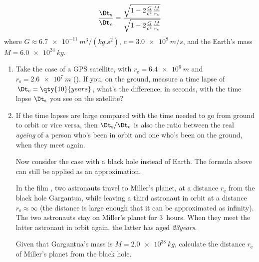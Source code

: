 \begin{exercise}[label={ex:clocks}]
{}
\begin{equation*}
  \frac{\Dt_{\text{s}}}{\Dt_{\text{e}}} =
  \frac{
    \sqrt{1-2\frac{G}{c^{2}}\frac{M}{r_{s}}}
  }{
    \sqrt{1-2\frac{G}{c^{2}}\frac{M}{r_{e}}}
  }
\end{equation*}
where $G\approx\qty{6.7e-11}{m^{3}/(kg.s^{2})}$, $c=\qty{3.0e8}{m/s}$, and the Earth's mass $M=\qty{6.0e24}{kg}$.

\begin{enumerate}[exerc]
\item\label{item:gps_clock} Take the case of a GPS satellite, with $r_{\text{e}}=\qty{6.4e6}{m}$ and $r_{\text{s}}=\qty{2.6e7}{m}$ (). If you, on the ground, measure a time lapse of $\Dt_{\text{e}}=\qty{10}{years}$, what's the difference, in seconds, with the time lapse $\Dt_{\text{s}}$ you see on the satellite?

\item\label{item:interstellar} If the time lapses are large compared with the time needed to go from ground to orbit or vice versa, then $\Dt_{\text{s}}/\Dt_{\text{e}}$ is also the ratio between the real \emph{ageing} of a person who's been in orbit and one who's been on the ground, when they meet again.

  Now consider the case with a black hole instead of Earth. The formula above can still be applied as an approximation.

  In the film , two
  astronauts travel to Miller's planet, at a distance $r_{\text{e}}$ from the black hole Gargantua, while leaving a third astronaut in orbit at a distance $r_{\text{s}}\approx \infty$ (the distance is large enough that it can be approximated as infinity). The two astronauts stay on Miller's planet for \qty{3}{hours}. When they meet the latter astronaut in orbit again, the latter has aged \emph{23\;years}.

  Given that Gargantua's mass is $M=\qty{2.0e38}{kg}$, calculate the distance $r_{\text{e}}$ of Miller's planet from the black hole.
\end{enumerate}
\end{exercise}



